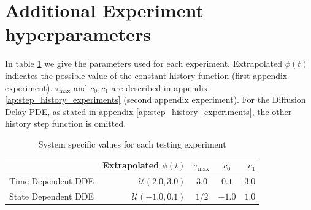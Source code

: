 \documentclass[pmlr]{jmlr}%
\begin{document}





\section{Additional Experiment hyperparameters} 
\label{ap:step_history_function}
\label{sss:history_function}

In table \ref{tab:exp_his}  we give the parameters used for each experiment. Extrapolated $\phi(t)$ indicates the possible value of the constant history function (first appendix experiment).  $\tau_{\text{max}}$ and $c_0, c_1$ are described in appendix \ref{ap:step_history_experiments} (second appendix experiment). For the Diffusion Delay PDE, as stated in appendix \ref{ap:step_history_experiments}, the other history step function is omitted. 


\begin{table}[H]
\vskip 0.15in
\begin{center}
\begin{small}
\begin{tabular}{lrccr}
\toprule
& Extrapolated $\phi(t)$ & $\tau_{\text{max}}$ & $c_0$ & $c_1$ \\
\hline
Time Dependent DDE & $\mathcal{U}(2.0, 3.0)$ & $3.0$ & $0.1$ & $3.0$ \\
State Dependent DDE & $\mathcal{U}(-1.0, 0.1)$ & $1/2$ & $-1.0$ & $1.0$ \\
\bottomrule
\end{tabular}
\end{small}
\end{center}
\caption{System specific values for each testing experiment}
\label{tab:exp_his}
\end{table}
\end{document}
